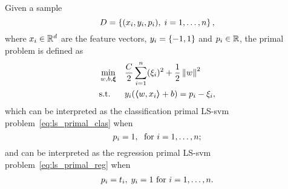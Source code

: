 \begin{definition}
    Given a sample
    $$ D = \left\{(x_i, y_i, p_i), \; i=1, \ldots, n\right\} ,$$
    where $x_i \in \mathbb{R}^d$ are the feature vectors, $y_i = \left\{-1, 1\right\}$ and $p_i \in \mathbb{R}$, 
    the primal problem is defined as
    \begin{equation}
        \label{eq:ls_primal}
        \begin{aligned}
            &\min_{w, b, \fv{\xi}} & & \frac{C}{2} \sum_{i=1}^\nsamples (\xi_i)^2 + \frac{1}{2} \norm{w}^2 \\
            & \text{s.t.} & & y_i (\dotp{w}{x_i} + b) = p_i - \xi_i ,     
        \end{aligned}  
    \end{equation}
    which can be interpreted as the classification primal LS-\acrshort{svm} problem~\eqref{eq:ls_primal_clas} when
    $$ p_i = 1,\; \text{ for } i=1, \ldots, n ;$$
    and can be interpreted as the regression primal LS-\acrshort{svm} problem~\eqref{eq:ls_primal_reg} when
    \begin{equation}
        \nonumber
        \begin{aligned}
            p_i = t_i  ,\; y_i = 1 \text{ for } i=1, \ldots, n . \\
        \end{aligned}
    \end{equation}
\end{definition}
%
